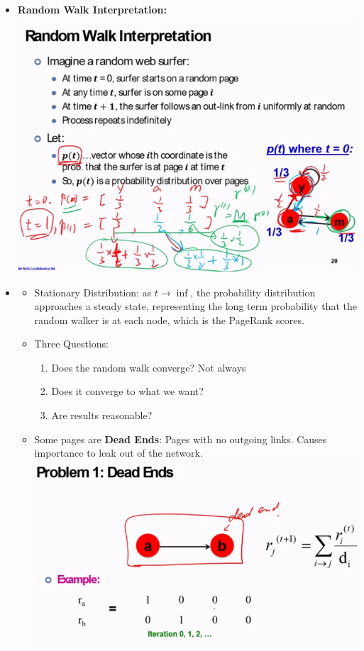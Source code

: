 \documentclass[10pt, landscape]{article}
\begin{document}
\begin{multicols*}{4}
\begin{itemize}
\begin{itemize}
\begin{enumerate}
          \end{enumerate}
        \end{itemize}
    \item \textbf{Random Walk Interpretation:}
          \includegraphics*[width=0.95\linewidth]{random_walk_interpretation.png}
    \item \begin{itemize}
      \item Stationary Distribution: as $ t \rightarrow \inf $, the probability distribution approaches a steady state, representing the long term probability that the random walker is at each node, which is the PageRank scores.
      \item Three Questions:
          \begin{enumerate}
            \item Does the random walk converge? Not always
            \item Does it converge to what we want? 
            \item Are results reasonable?
          \end{enumerate}
        \item Some pages are \textbf{Dead Ends}: Pages with no outgoing links. Causes importance to leak out of the network. \includegraphics*[width=0.95\linewidth]{deadend.png}

\end{itemize}
\end{itemize}
\end{multicols*}
\end{document}
